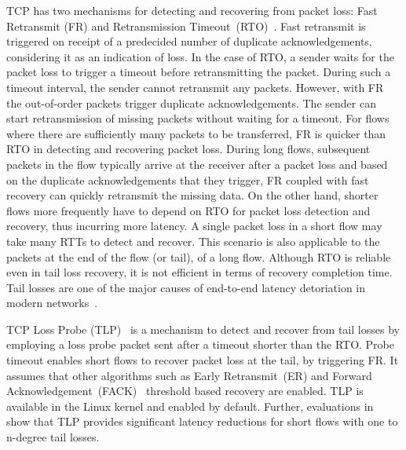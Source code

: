 \documentclass[10pt,conference]{IEEEtran}
\begin{document}
TCP has two mechanisms for detecting and recovering from packet loss: Fast Retransmit (FR) and Retransmission Timeout~(RTO)~\cite{Flach:2013}. 
Fast retransmit is triggered on receipt of a predecided number of duplicate acknowledgements, considering it as an indication of loss. In the case 
of RTO, a sender waits for the packet loss to trigger a timeout before retransmitting the packet. During such a timeout interval, 
the sender cannot retransmit any 
packets. However, with FR the out-of-order packets trigger duplicate acknowledgements. The sender can start retransmission of missing packets 
without waiting for a timeout. For flows where there are sufficiently many packets to be transferred, FR is quicker than RTO in detecting and 
recovering packet loss. During long flows, subsequent packets in the flow typically arrive at the receiver after a packet loss and based
on the duplicate acknowledgements that they trigger, FR coupled with fast recovery can quickly retransmit the missing data. 
On the other hand, shorter flows more frequently have to depend on RTO for packet loss detection and recovery, thus incurring more latency. A single 
packet loss in a short flow may take many RTTs to detect and recover. This scenario is also applicable to the packets at the end of the flow 
(or tail), of a long flow. Although RTO is reliable even in tail loss recovery, it is not efficient in terms of recovery completion time. Tail 
losses are one of the major causes of end-to-end latency detoriation in modern networks~\cite{Flach:2013}. 


TCP Loss Probe (TLP)~\cite{Flach:2013} is a mechanism to detect and recover from tail losses by employing a loss probe packet sent after a timeout shorter
than the RTO. Probe timeout enables short flows to recover packet loss at the tail, by triggering FR. It assumes that other algorithms such as 
Early Retransmit~(ER)\cite{rfc5827} and Forward Acknowledgement~(FACK)~\cite{FACK} threshold based recovery are enabled. TLP is available in the Linux 
kernel and enabled by default. Further, evaluations in~\cite{Rajiullah:2015} show that TLP provides significant latency reductions for short 
flows with one to n-degree tail losses. 
\end{document}
